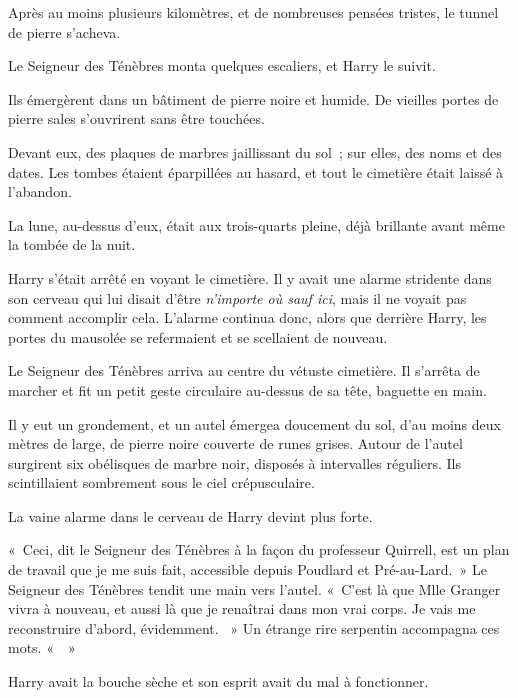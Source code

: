 Après au moins plusieurs kilomètres, et de nombreuses pensées tristes, le tunnel de pierre s'acheva.

Le Seigneur des Ténèbres monta quelques escaliers, et Harry le suivit.

Ils émergèrent dans un bâtiment de pierre noire et humide. De vieilles portes de pierre sales s'ouvrirent sans être touchées.

Devant eux, des plaques de marbres jaillissant du sol~; sur elles, des noms et des dates. Les tombes étaient éparpillées au hasard, et tout le cimetière était laissé à l'abandon.

La lune, au-dessus d'eux, était aux trois-quarts pleine, déjà brillante avant même la tombée de la nuit.

Harry s'était arrêté en voyant le cimetière. Il y avait une alarme stridente dans son cerveau qui lui disait d'être \emph{n'importe où sauf ici}, mais il ne voyait pas comment accomplir cela. L'alarme continua donc, alors que derrière Harry, les portes du mausolée se refermaient et se scellaient de nouveau.

Le Seigneur des Ténèbres arriva au centre du vétuste cimetière. Il s'arrêta de marcher et fit un petit geste circulaire au-dessus de sa tête, baguette en main.

Il y eut un grondement, et un autel émergea doucement du sol, d'au moins deux mètres de large, de pierre noire couverte de runes grises. Autour de l'autel surgirent six obélisques de marbre noir, disposés à intervalles réguliers. Ils scintillaient sombrement sous le ciel crépusculaire.

La vaine alarme dans le cerveau de Harry devint plus forte.

«~Ceci, dit le Seigneur des Ténèbres à la façon du professeur Quirrell, est un plan de travail que je me suis fait, accessible depuis Poudlard et Pré-au-Lard.~» Le Seigneur des Ténèbres tendit une main vers l'autel. «~C'est là que Mlle Granger vivra à nouveau, et aussi là que je renaîtrai dans mon vrai corps. Je vais me reconstruire d'abord, évidemment. ~» Un étrange rire serpentin accompagna ces mots. «~~»

Harry avait la bouche sèche et son esprit avait du mal à fonctionner.


